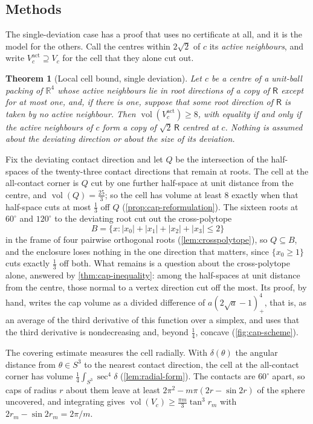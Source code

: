 \documentclass[11pt,reqno]{amsart}
\renewcommand{\_}{\origunderscore\allowbreak}
\numberwithin{equation}{section}
\theoremstyle{plain}
\newtheorem{thm}{Theorem}[section]
\theoremstyle{definition}
\theoremstyle{remark}
\newcommand{\Rt}{\mathsf{R}}                 %
\DeclareMathOperator{\vol}{vol}
\begin{document}
\subsection{Methods}\label{sec:methods-intro}

The single-deviation case has a proof that uses no certificate at all,
and it is the model for the others. Call the centres within $2\sqrt2$ of
$c$ its \emph{active neighbours}, and write
$V_c^{\mathrm{act}}\supseteq V_c$ for the cell that they alone cut out.

\begin{thm}[Local cell bound, single deviation]\label{thm:local-uncond}
Let $c$ be a centre of a unit-ball packing of $\mathbb{R}^4$ whose active
neighbours lie in root directions of a copy of $\Rt$ except for at most
one, and, if there is one, suppose that some root direction of $\Rt$ is
taken by no active neighbour. Then $\vol(V_c^{\mathrm{act}})\ge8$, with
equality if and only if the active neighbours of $c$ form a copy of
$\sqrt2\,\Rt$ centred at $c$. Nothing is assumed about the deviating
direction or about the size of its deviation.
\end{thm}

Fix the deviating contact direction and let $Q$ be the intersection of
the half-spaces of the twenty-three contact directions that remain at
roots. The cell at the all-contact corner is $Q$ cut by one further
half-space at unit distance from the centre, and $\vol(Q)=\frac{25}{3}$;
so the cell has volume at least $8$ exactly when that half-space cuts at
most $\frac13$ off $Q$ (\cref{prop:cap-reformulation}). The sixteen roots
at $60^\circ$ and $120^\circ$ to the deviating root cut out the
cross-polytope
\[
  B=\bigl\{x : |x_0|+|x_1|+|x_2|+|x_3|\le2\bigr\}
\]
in the frame of four pairwise orthogonal roots (\cref{lem:crosspolytope}),
so $Q\subseteq B$, and the enclosure loses nothing in the one direction
that matters, since $\{x_0\ge1\}$ cuts exactly $\frac13$ off both. What
remains is a question about the cross-polytope alone, answered by
\cref{thm:cap-inequality}: among the half-spaces at unit distance from the
centre, those normal to a vertex direction cut off the most. Its proof,
by hand, writes the cap volume as a divided difference of
$a(2\sqrt a-1)_+^4$, that is, as an average of the third derivative of
this function over a simplex, and uses that the third derivative is
nondecreasing and, beyond $\frac14$, concave (\cref{fig:cap-scheme}).

The covering estimate measures the cell radially. With $\delta(\theta)$ the
angular distance from $\theta\in S^3$ to the nearest contact direction, the
cell at the all-contact corner has volume
$\frac14\int_{S^3}\sec^4\delta$ (\cref{lem:radial-form}). The contacts are
$60^\circ$ apart, so caps of radius $r$ about them leave at least
$2\pi^2-m\pi(2r-\sin2r)$ of the sphere uncovered, and integrating gives
$\vol(V_c)\ge\frac{\pi m}{3}\tan^3r_m$ with $2r_m-\sin2r_m=2\pi/m$.
\end{document}

